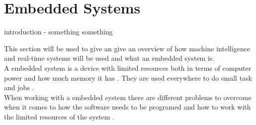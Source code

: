 \section{Embedded Systems}
introduction - something something

This section will be used to give an give an overview of how machine
intelligence and real-time systems will be used and what an embedded system
is.\\

A embedded system is a device with limited resources both in terms of computer
power and how much memory it has \PS. They are used everywhere to do small task
and jobs \PS.\\

When working with a embedded system there are different problems to overcome
when it comes to how the software needs to be programed and how to work with the
limited resources of the system \PS.\\

% 
% 
